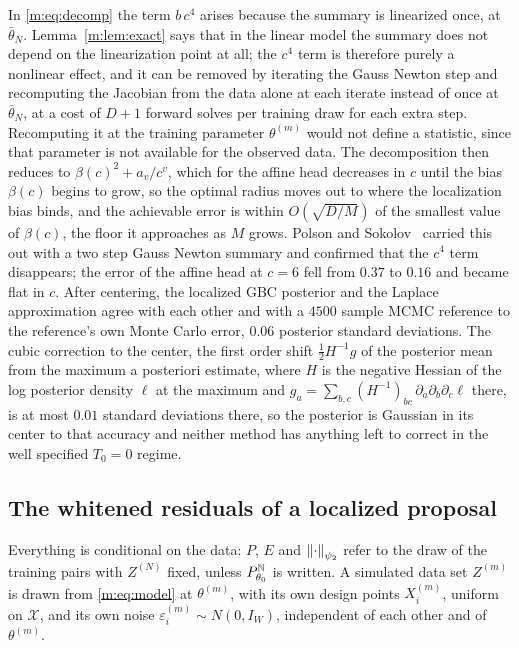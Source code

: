 \begin{remark}\label{m:rem:relin}
In \eqref{m:eq:decomp} the term $b\,c^4$ arises because the summary is linearized once, at $\bar\theta_N$. Lemma~\ref{m:lem:exact} says that in the linear model the summary does not depend on the linearization point at all; the $c^4$ term is therefore purely a nonlinear effect, and it can be removed by iterating the Gauss Newton step and recomputing the Jacobian from the data alone at each iterate instead of once at $\bar\theta_N$, at a cost of $D+1$ forward solves per training draw for each extra step. Recomputing it at the training parameter $\theta^{(m)}$ would not define a statistic, since that parameter is not available for the observed data. The decomposition then reduces to $\beta(c)^2+a_v/c^v$, which for the affine head decreases in $c$ until the bias $\beta(c)$ begins to grow, so the optimal radius moves out to where the localization bias binds, and the achievable error is within $O(\sqrt{D/M})$ of the smallest value of $\beta(c)$, the floor it approaches as $M$ grows. Polson and Sokolov~\cite{polsonsokolov2026} carried this out with a two step Gauss Newton summary and confirmed that the $c^4$ term disappears; the error of the affine head at $c=6$ fell from $0.37$ to $0.16$ and became flat in $c$. After centering, the localized GBC posterior and the Laplace approximation agree with each other and with a $4500$ sample MCMC reference to the reference's own Monte Carlo error, $0.06$ posterior standard deviations. The cubic correction to the center, the first order shift $\frac12H^{-1}g$ of the posterior mean from the maximum a posteriori estimate, where $H$ is the negative Hessian of the log posterior density $\ell$ at the maximum and $g_a=\sum_{b,c}(H^{-1})_{bc}\,\partial_a\partial_b\partial_c\ell$ there, is at most $0.01$ standard deviations there, so the posterior is Gaussian in its center to that accuracy and neither method has anything left to correct in the well specified $T_0=0$ regime.
\end{remark}

\subsection{The whitened residuals of a localized proposal}\label{m:sec:u2ploc}

Everything is conditional on the data: $P$, $E$ and $\left\|\cdot\right\|_{\psi_2}$ refer to the draw of the training pairs with $Z^{(N)}$ fixed, unless $P^{\mathbb{N}}_{\theta_0}$ is written. A simulated data set $Z^{(m)}$ is drawn from \eqref{m:eq:model} at $\theta^{(m)}$, with its own design points $X^{(m)}_i$, uniform on $\mathcal X$, and its own noise $\varepsilon^{(m)}_i\sim N(0,I_W)$, independent of each other and of $\theta^{(m)}$.

